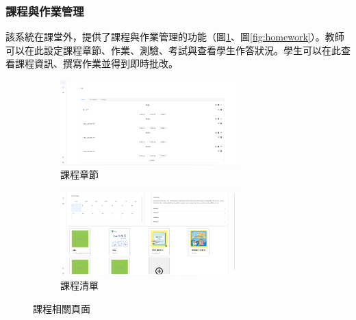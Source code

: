 \subsubsection{課程與作業管理}

該系統在課堂外，提供了課程與作業管理的功能（圖\ref{fig:course}、圖\ref{fig:homework}）。教師可以在此設定課程章節、作業、測驗、考試與查看學生作答狀況。學生可以在此查看課程資訊、撰寫作業並得到即時批改。

\begin{figure}[H]
  \begin{subfigure}{0.5\linewidth}
    \centering
    \includegraphics[width=0.75\textwidth]{images/chapter.png}
    \caption{課程章節}
  \end{subfigure}
  \begin{subfigure}{0.5\linewidth}
    \centering
    \includegraphics[width=0.75\textwidth]{images/course.png}
    \caption{課程清單}
  \end{subfigure}
  \caption{課程相關頁面}
  \label{fig:course}
\end{figure}


